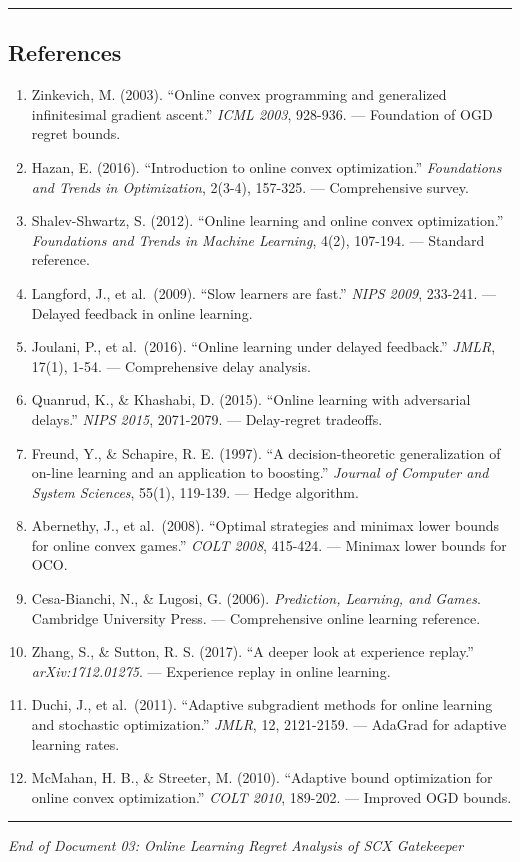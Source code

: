 \documentclass[
  12pt,
]{ctexart}
\providecommand{\tightlist}{%
  \setlength{\itemsep}{0pt}\setlength{\parskip}{0pt}}
\begin{document}
\begin{center}\rule{0.5\linewidth}{0.5pt}\end{center}

\subsection{References}\label{references}

\begin{enumerate}
\def\labelenumi{\arabic{enumi}.}
\tightlist
\item
  Zinkevich, M. (2003). ``Online convex programming and generalized
  infinitesimal gradient ascent.'' \emph{ICML 2003}, 928-936. ---
  Foundation of OGD regret bounds.
\item
  Hazan, E. (2016). ``Introduction to online convex optimization.''
  \emph{Foundations and Trends in Optimization}, 2(3-4), 157-325. ---
  Comprehensive survey.
\item
  Shalev-Shwartz, S. (2012). ``Online learning and online convex
  optimization.'' \emph{Foundations and Trends in Machine Learning},
  4(2), 107-194. --- Standard reference.
\item
  Langford, J., et al.~(2009). ``Slow learners are fast.'' \emph{NIPS
  2009}, 233-241. --- Delayed feedback in online learning.
\item
  Joulani, P., et al.~(2016). ``Online learning under delayed
  feedback.'' \emph{JMLR}, 17(1), 1-54. --- Comprehensive delay
  analysis.
\item
  Quanrud, K., \& Khashabi, D. (2015). ``Online learning with
  adversarial delays.'' \emph{NIPS 2015}, 2071-2079. --- Delay-regret
  tradeoffs.
\item
  Freund, Y., \& Schapire, R. E. (1997). ``A decision-theoretic
  generalization of on-line learning and an application to boosting.''
  \emph{Journal of Computer and System Sciences}, 55(1), 119-139. ---
  Hedge algorithm.
\item
  Abernethy, J., et al.~(2008). ``Optimal strategies and minimax lower
  bounds for online convex games.'' \emph{COLT 2008}, 415-424. ---
  Minimax lower bounds for OCO.
\item
  Cesa-Bianchi, N., \& Lugosi, G. (2006). \emph{Prediction, Learning,
  and Games}. Cambridge University Press. --- Comprehensive online
  learning reference.
\item
  Zhang, S., \& Sutton, R. S. (2017). ``A deeper look at experience
  replay.'' \emph{arXiv:1712.01275}. --- Experience replay in online
  learning.
\item
  Duchi, J., et al.~(2011). ``Adaptive subgradient methods for online
  learning and stochastic optimization.'' \emph{JMLR}, 12, 2121-2159.
  --- AdaGrad for adaptive learning rates.
\item
  McMahan, H. B., \& Streeter, M. (2010). ``Adaptive bound optimization
  for online convex optimization.'' \emph{COLT 2010}, 189-202. ---
  Improved OGD bounds.
\end{enumerate}

\begin{center}\rule{0.5\linewidth}{0.5pt}\end{center}

\emph{End of Document 03: Online Learning Regret Analysis of SCX
Gatekeeper}
\end{document}
